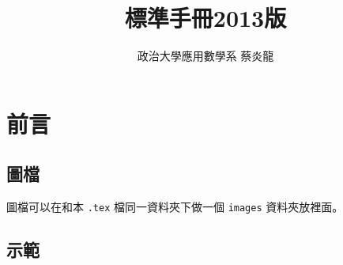 \documentclass[12pt]{report}
\title{\bf{標準手冊2013版}}
\author{政治大學應用數學系 蔡炎龍}
\begin{document}
\maketitle

\tableofcontents
\chapter{前言}
\section{圖檔}
圖檔可以在和本 \verb|.tex| 檔同一資料夾下做一個 \verb|images| 資料夾放裡面。


\section{示範}
\end{document}
